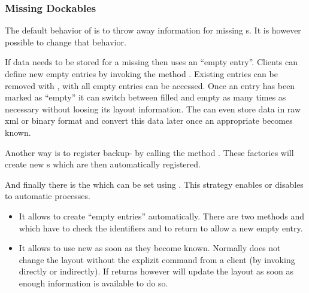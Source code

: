 \subsubsection{Missing Dockables}
The default behavior of  is to throw away information for missing s. It is however possible to change that behavior.

If data needs to be stored for a missing  then  uses an ``empty entry''. Clients can define new empty entries by invoking the method . Existing entries can be removed with , with  all empty entries can be accessed. Once an entry has been marked as ``empty'' it can switch between filled and empty as many times as necessary without loosing its layout information. The  can even store data in raw xml or binary format and convert this data later once an appropriate  becomes known.


Another way is to register backup- by calling the method . These factories will create new s which are then automatically registered.


And finally there is the  which can be set using . This strategy enables or disables to automatic processes.
\begin{itemize}
 \item It allows to create ``empty entries'' automatically. There are two methods  and  which have to check the identifiers and to return  to allow a new empty entry.
 \item It allows to use new  as soon as they become known. Normally  does not change the layout without the explizit command from a client (by invoking  directly or indirectly). If  returns  however  will update the layout as soon as enough information is available to do so.
\end{itemize}



